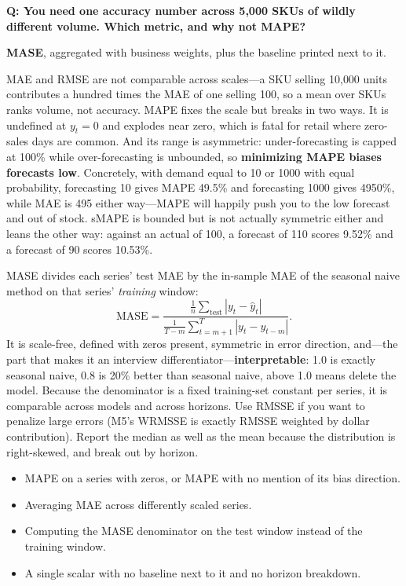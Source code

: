 \begin{interviewq}
\textbf{Q: You need one accuracy number across 5{,}000 SKUs of wildly different volume. Which metric, and why not MAPE?}

 \quad {} \quad \badgefreq{\freqmed}

\stronganswer

\textbf{MASE}, aggregated with business weights, plus the baseline printed next to it.

MAE and RMSE are not comparable across scales---a SKU selling 10{,}000 units contributes a hundred times the MAE of one selling 100, so a mean over SKUs ranks volume, not accuracy. MAPE fixes the scale but breaks in two ways. It is undefined at $y_t = 0$ and explodes near zero, which is fatal for retail where zero-sales days are common. And its range is asymmetric: under-forecasting is capped at 100\% while over-forecasting is unbounded, so \textbf{minimizing MAPE biases forecasts low}. Concretely, with demand equal to 10 or 1000 with equal probability, forecasting 10 gives MAPE 49.5\% and forecasting 1000 gives 4950\%, while MAE is 495 either way---MAPE will happily push you to the low forecast and out of stock. sMAPE is bounded but is not actually symmetric either and leans the other way: against an actual of 100, a forecast of 110 scores 9.52\% and a forecast of 90 scores 10.53\%.

MASE divides each series' test MAE by the in-sample MAE of the seasonal naive method on that series' \emph{training} window:
\[
\text{MASE} = \frac{\frac{1}{n}\sum_{\text{test}}|y_t - \hat{y}_t|}{\frac{1}{T-m}\sum_{t=m+1}^{T}|y_t - y_{t-m}|}.
\]
It is scale-free, defined with zeros present, symmetric in error direction, and---the part that makes it an interview differentiator---\textbf{interpretable}: 1.0 is exactly seasonal naive, 0.8 is 20\% better than seasonal naive, above 1.0 means delete the model. Because the denominator is a fixed training-set constant per series, it is comparable across models and across horizons. Use RMSSE if you want to penalize large errors (M5's WRMSSE is exactly RMSSE weighted by dollar contribution). Report the median as well as the mean because the distribution is right-skewed, and break out by horizon.

\redflags
\begin{itemize}
    \item MAPE on a series with zeros, or MAPE with no mention of its bias direction.
    \item Averaging MAE across differently scaled series.
    \item Computing the MASE denominator on the test window instead of the training window.
    \item A single scalar with no baseline next to it and no horizon breakdown.
\end{itemize}


\end{interviewq}
